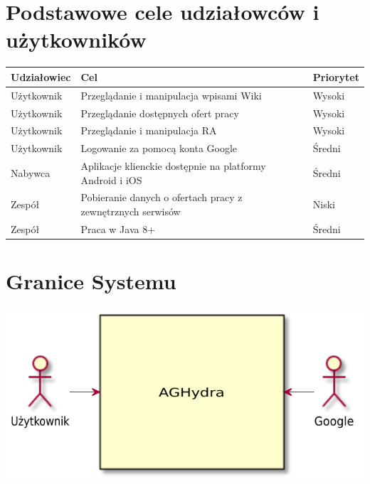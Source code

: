 \documentclass[oneside]{scrreprt}
\begin{document}
\section{Podstawowe cele udziałowców i użytkowników}
\begin{table}[ht]
	\centering
	\begin{tabular}{p{2.5cm}|p{10cm}|p{2cm}}
		\textbf{Udziałowiec}               & \textbf{Cel}                                                & \textbf{Priorytet} \\ \hline
		\multicolumn{1}{l|}{Użytkownik}    & Przeglądanie i manipulacja wpisami Wiki                     & Wysoki    \\ \hline
		\multicolumn{1}{l|}{Użytkownik}    & Przeglądanie dostępnych ofert pracy                         & Wysoki    \\ \hline
		\multicolumn{1}{l|}{Użytkownik}    & Przeglądanie i manipulacja RA                               & Wysoki    \\ \hline
		\multicolumn{1}{l|}{Użytkownik}    & Logowanie za pomocą konta Google                            & Średni    \\ \hline
		\multicolumn{1}{l|}{Nabywca}       & Aplikacje klienckie dostępnie na platformy Android i iOS    & Średni    \\ \hline
		\multicolumn{1}{l|}{Zespół}        & Pobieranie danych o ofertach pracy z zewnętrznych serwisów  & Niski     \\ \hline
		\multicolumn{1}{l|}{Zespół}        & Praca w Java 8+                                             & Średni    \\ \hline
	\end{tabular}
\end{table}

\section{Granice Systemu}
\includegraphics[width=\textwidth, keepaspectratio]{graphics/system_border.pdf}
\end{document}
